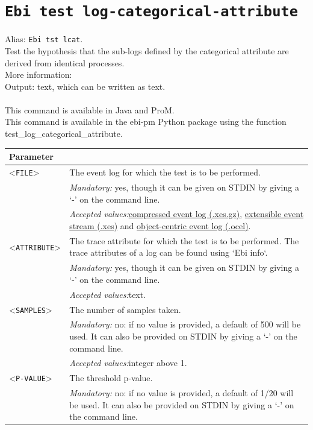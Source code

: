 {\clearpage\section{\texttt{Ebi test log-categorical-attribute}}
\label{command:Ebi test log-categorical-attribute}
Alias: \texttt{Ebi tst lcat}.\\
Test the hypothesis that the sub-logs defined by the categorical attribute are derived from identical processes.\\
More information: \cite{DBLP:journals/tkde/LeemansMPH23}~\\
\noindent Output: text, which can be written as  text.\\
\\This command is available in Java and ProM.
\\This command is available in the ebi-pm Python package using the function test\_log\_categorical\_attribute.
\begin{tabularx}{\linewidth}{lX}
\toprule
Parameter \\\midrule
<\texttt{FILE}>&The event log for which the test is to be performed.\\
&\textit{Mandatory:} \quad yes, though it can be given on STDIN by giving a `-' on the command line.\\
&\textit{Accepted values:}\quad \hyperref[filehandler:compressed event log]{compressed event log (.xes.gz)}, \hyperref[filehandler:extensible event stream]{extensible event stream (.xes)} and \hyperref[filehandler:object-centric event log]{object-centric event log (.ocel)}.\\
<\texttt{ATTRIBUTE}>&The trace attribute for which the test is to be performed. The trace attributes of a log can be found using `Ebi info`.\\
&\textit{Mandatory:} \quad yes, though it can be given on STDIN by giving a `-' on the command line.\\
&\textit{Accepted values:}\quad text.\\
<\texttt{SAMPLES}>&The number of samples taken.\\
&\textit{Mandatory:} \quad no: if no value is provided, a default of 500 will be used. It can also be provided on STDIN by giving a `-' on the command line.\\
&\textit{Accepted values:}\quad integer above 1.\\
<\texttt{P-VALUE}>&The threshold p-value.\\
&\textit{Mandatory:} \quad no: if no value is provided, a default of 1/20 will be used. It can also be provided on STDIN by giving a `-' on the command line.\\

\end{tabularx}}
